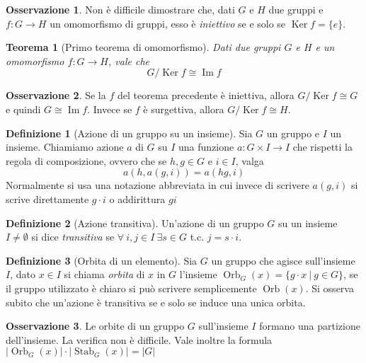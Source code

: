 \documentclass[11pt]{article}
\theoremstyle{plain}
\newtheorem{thm}{Teorema}[section]
\theoremstyle{definition}
\newtheorem{defn}{Definizione}[section]
\newtheorem*{rem}{Osservazione}
\theoremstyle{remark}
\DeclareMathOperator{\Orb}{Orb}
\DeclareMathOperator{\Stab}{Stab}
\DeclareMathOperator{\Ker}{Ker}
\DeclareMathOperator{\Imm}{Im}
\begin{document}
\begin{rem}
	Non è difficile dimostrare che, dati $G$ e $H$ due gruppi e $f:G\to H$ un omomorfismo di gruppi, esso è \textit{iniettivo} se e solo se $\Ker f = \{e\}$.
\end{rem}


\begin{thm}[Primo teorema di omomorfismo]\label{alg:primo_teo_omo}
	Dati due gruppi $G$ e $H$ e un omomorfismo $f:G\to H$, vale che
	\[ G/\Ker f \cong \Imm f\]
\end{thm}
\begin{rem}
	Se la $f$ del teorema precedente è iniettiva, allora $G/\Ker f\cong G$ e quindi $G\cong \Imm f$. Invece se $f$ è surgettiva, allora $G/\Ker f\cong H$.
\end{rem}



\begin{defn}[Azione di un gruppo su un insieme] Sia $G$ un gruppo e $I$ un insieme. Chiamiamo azione $a$ di $G$ su $I$ una funzione $a:G\times I \to I$ che rispetti la regola di composizione, ovvero che se $h,g\in G$ e $i \in I$, valga
\[ a(h,a(g,i)) = a(hg, i) \]
Normalmente si usa una notazione abbreviata in cui invece di scrivere $a(g,i)$ si scrive direttamente $g\cdot i$ o addirittura $gi$


\label{defn:azione}
\end{defn}


\begin{defn}[Azione transitiva]
Un'azione di un gruppo $G$ su un insieme $I\neq \emptyset$ si dice \textit{transitiva} se $\forall\ i,j\in I\ \exists s\in G$ t.c. $j=s\cdot i$.
\label{defn:azione transitiva}
\end{defn}


\begin{defn}[Orbita di un elemento]
Sia $G$ un gruppo che agisce sull'insieme $I$, dato $x\in I$ si chiama \textit{orbita} di $x$ in $G$ l'insieme $\Orb_{G}(x)=\{ g\cdot x\ |\ g\in G \}$, se il gruppo utilizzato è chiaro si può scrivere semplicemente $\Orb(x)$. Si osserva subito che un'azione è transitiva se e solo se induce una unica orbita.
\label{defn:orbita}
\end{defn}


\begin{rem} Le orbite di un gruppo $G$ sull'insieme $I$ formano una partizione dell'insieme. La verifica non è difficile. Vale inoltre la formula $|\Orb_G(x)| \cdot |\Stab_G(x)| = |G|$
\end{rem}
\end{document}
